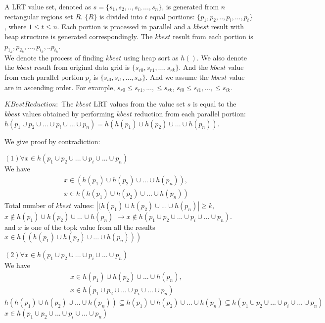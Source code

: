 \documentclass[AMA,LATO1COL]{WileyNJD-v2}
\begin{document}
A LRT value set, denoted as $s=\{s_1,s_2, .., s_i,...,s_n\}$, is generated from $n$ rectangular regions set ${R}$. $\{R\}$ is divided into $t$ equal portions: $\{p_1,p_2,..,p_i,...,p_t\}$, where $1\le t\le n$. Each portion is processed in parallel and a $kbest$ result with heap structure is generated correspondingly. The $kbest$ result from each portion is $p_{1_k},p_{2_k},...,p_{i_k},..p_{t_k}$.\\ We denote the process of finding $kbest$ using heap sort as $h()$. We also denote the $kbest$ result from original data grid is $\{s_{r0},s_{r1},...,s_{rk}\}$. And the $kbest$ value from each parallel portion $p_i$ is $\{s_{i0},s_{i1},...,s_{ik}\}$. And we assume the $kbest$ value are in ascending order. For example, $s_{r0}\le s_{r1},...,\le s_{rk}$, $s_{i0}\le s_{i1},...,\le s_{ik}$.
\begin{lemma}{\bf $KBestReduction:$} The $kbest$ LRT values from the value set ${s}$ is equal to the $kbest$ values obtained by performing $kbest$ reduction from each parallel portion:
$h(p_1\cup p_2\cup ...\cup p_i \cup...\cup p_n)=h(h(p_1)\cup h(p_2)\cup ...\cup h(p_n))$.
\end{lemma}
We give proof by contradiction:

\noindent $(1)\forall x\in h(p_1\cup p_2\cup ...\cup p_i \cup...\cup p_n)$\\
We have
\vspace{-5mm}
\begin{eqnarray}
x\in (h(p_1)\cup h(p_2)\cup ...\cup h(p_n)),&\\
 x\in h(h(p_1)\cup h(p_2)\cup ...\cup h(p_n))
\end{eqnarray}
Total number of $kbest$ values:
$|(h(p_1)\cup h(p_2)\cup ...\cup h(p_n)|\ge k$, \\
$x \notin h(p_1)\cup h(p_2)\cup ...\cup h(p_n)$ $\rightarrow x \notin h(p_1\cup p_2\cup ...\cup p_i \cup...\cup p_n)$.\\   and $x$ is one of the topk value from all the results\\
 $x\in h((h(p_1)\cup h(p_2)\cup ...\cup h(p_n)))$

\noindent $(2) \forall x\in h(p_1\cup p_2\cup ...\cup p_i \cup...\cup p_n)$\\
We have
\vspace{-5mm}
\begin{eqnarray}
x\in h(p_1)\cup h(p_2)\cup ...\cup h(p_n),&\\
x\in h(p_1\cup p_2\cup ...\cup p_i \cup...\cup p_n)
\end{eqnarray}
 $h(h(p_1)\cup h(p_2)\cup ...\cup h(p_n))\subseteq h(p_1)\cup h(p_2)\cup ...\cup h(p_n) \subseteq h(p_1\cup p_2\cup ...\cup p_i \cup...\cup p_n)$\\
$x\in h(p_1\cup p_2\cup ...\cup p_i \cup...\cup p_n)$
\end{document}
